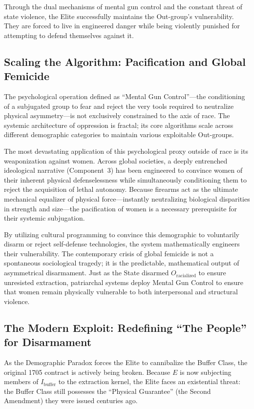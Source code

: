 \documentclass[12pt,openany]{book}
\begin{document}
Through the dual mechanisms of mental gun control and the constant threat of state violence, the Elite successfully maintains the Out-group's vulnerability. They are forced to live in engineered danger while being violently punished for attempting to defend themselves against it.

\subsection{Scaling the Algorithm: Pacification and Global Femicide}

The psychological operation defined as ``Mental Gun Control''---the conditioning of a subjugated group to fear and reject the very tools required to neutralize physical asymmetry---is not exclusively constrained to the axis of race. The systemic architecture of oppression is fractal; its core algorithms scale across different demographic categories to maintain various exploitable Out-groups.

The most devastating application of this psychological proxy outside of race is its weaponization against women. Across global societies, a deeply entrenched ideological narrative (Component~3) has been engineered to convince women of their inherent physical defenselessness while simultaneously conditioning them to reject the acquisition of lethal autonomy. Because firearms act as the ultimate mechanical equalizer of physical force---instantly neutralizing biological disparities in strength and size---the pacification of women is a necessary prerequisite for their systemic subjugation.

By utilizing cultural programming to convince this demographic to voluntarily disarm or reject self-defense technologies, the system mathematically engineers their vulnerability. The contemporary crisis of global femicide is not a spontaneous sociological tragedy; it is the predictable, mathematical output of asymmetrical disarmament. Just as the State disarmed $O_{\text{racialized}}$ to ensure unresisted extraction, patriarchal systems deploy Mental Gun Control to ensure that women remain physically vulnerable to both interpersonal and structural violence.

\subsection{The Modern Exploit: Redefining ``The People'' for Disarmament}

As the Demographic Paradox forces the Elite to cannibalize the Buffer Class, the original 1705 contract is actively being broken. Because $E$ is now subjecting members of $I_{\text{buffer}}$ to the extraction kernel, the Elite faces an existential threat: the Buffer Class still possesses the ``Physical Guarantee'' (the Second Amendment) they were issued centuries ago.
\end{document}
